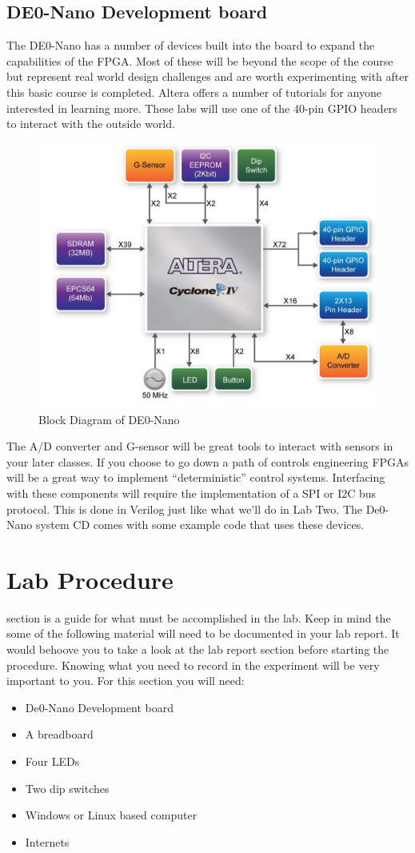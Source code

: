 \documentclass[12pt,journal]{IEEEtran}
\begin{document}
    \subsection{DE0-Nano Development board}
      The DE0-Nano has a number of devices built into the board to expand the capabilities of the FPGA. Most of these will be beyond the scope of the course but represent real world design challenges and are worth experimenting with after this basic course is completed. Altera offers a number of tutorials for anyone interested in learning more. These labs will use one of the 40-pin GPIO headers to interact with the outside world. 
      \begin{figure}[htpb]
        \includegraphics[width=.48\textwidth]{Images/DEONanoBlockDiagram.png}
        \caption{Block Diagram of DE0-Nano \cite{DE0Manual}}
      \end{figure}
      The A/D converter and G-sensor will be great tools to interact with sensors in your later classes. If you choose to go down a path of controls engineering FPGAs will be a great way to implement ``deterministic'' control systems. Interfacing with these components will require the implementation of a SPI or I2C bus protocol. This is done in Verilog just like what we'll do in Lab Two. The De0-Nano system CD comes with some example code that uses these devices. 

  \section{Lab Procedure}
     section is a guide for what must be accomplished in the lab. Keep in mind the some of the following material will need to be documented in your lab report. It would behoove you to take a look at the lab report section before starting the procedure. Knowing what you need to record in the experiment will be very important to you. For this section you will need:
    \begin{itemize}
      \item De0-Nano Development board
      \item A breadboard
      \item Four LEDs
      \item Two dip switches
      \item Windows or Linux based computer
      \item Internets
    \end{itemize}
\end{document}
